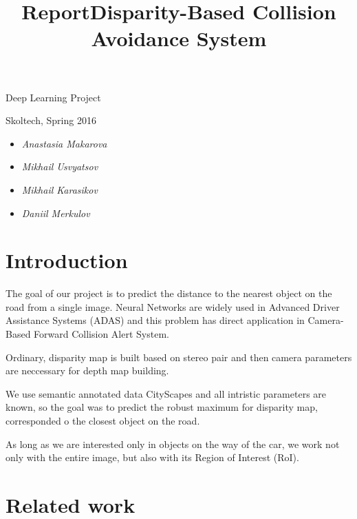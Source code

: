 \documentclass{article}
\title{Report}
\providecommand{\tightlist}{%
      \setlength{\itemsep}{0pt}\setlength{\parskip}{0pt}}
\begin{document}
    
    \title{Disparity-Based Collision Avoidance System}
    
    \maketitle
    
    

    

Deep Learning Project

Skoltech, Spring 2016

\begin{itemize}
\tightlist
\item
  \emph{Anastasia Makarova}
\item
  \emph{Mikhail Usvyatsov}
\item
  \emph{Mikhail Karasikov}
\item
  \emph{Daniil Merkulov}
\end{itemize}

    \section{Introduction}\label{introduction}

    The goal of our project is to predict the distance to the nearest object
on the road from a single image. Neural Networks are widely used in
Advanced Driver Assistance Systems (ADAS) and this problem has direct
application in Camera-Based Forward Collision Alert System.

Ordinary, disparity map is built based on stereo pair and then camera
parameters are neccessary for depth map building.

    \begin{figure}[htbp]
    \begin{center}
    \end{center}
\caption{}
\end{figure}

    We use semantic annotated data CityScapes and all intristic parameters
are known, so the goal was to predict the robust maximum for disparity
map, corresponded o the closest object on the road.

    As long as we are interested only in objects on the way of the car, we
work not only with the entire image, but also with its Region of
Interest (RoI).

    \section{Related work}\label{related-work}
\end{document}
